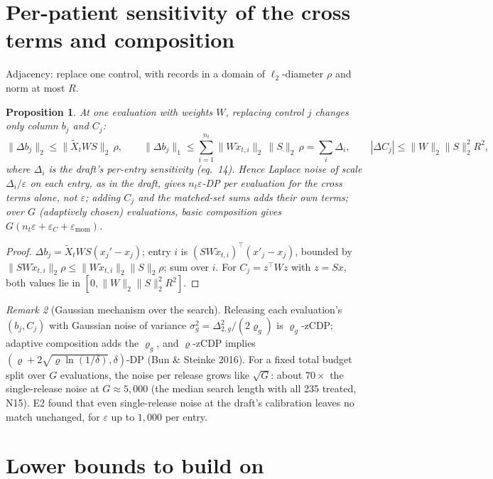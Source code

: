 \documentclass[11pt]{article}
\newtheorem{proposition}{Proposition}
\theoremstyle{remark}
\newtheorem{remark}[proposition]{Remark}
\begin{document}
\section{Per-patient sensitivity of the cross terms and composition}

Adjacency: replace one control, with records in a domain of $\ell_2$-diameter $\rho$ and norm at
most $R$.

\begin{proposition}\label{prop:sens}
At one evaluation with weights $W$, replacing control $j$ changes only column $b_j$ and $C_j$:
\[
\|\Delta b_j\|_2\le\|\tilde X_tWS\|_2\,\rho,\qquad
\|\Delta b_j\|_1\le\sum_{i=1}^{n_t}\|W\tilde x_{t,i}\|_2\,\|S\|_2\,\rho=\sum_i\Delta_i,\qquad
|\Delta C_j|\le\|W\|_2\|S\|_2^2R^2,
\]
where $\Delta_i$ is the draft's per-entry sensitivity (eq.~14). Hence Laplace noise of scale
$\Delta_i/\varepsilon$ on each entry, as in the draft, gives $n_t\varepsilon$-DP per evaluation
for the cross terms alone, not $\varepsilon$; adding $C_j$ and the matched-set sums adds
their own terms; over $G$ (adaptively chosen) evaluations, basic composition gives
$G(n_t\varepsilon+\varepsilon_C+\varepsilon_{\mathrm{mom}})$.
\end{proposition}
\begin{proof}
$\Delta b_j=\tilde X_tWS(x_j'-x_j)$; entry $i$ is $(SW\tilde x_{t,i})^\top(x'_j-x_j)$, bounded by
$\|SW\tilde x_{t,i}\|_2\rho\le\|W\tilde x_{t,i}\|_2\|S\|_2\rho$; sum over $i$. For $C_j=z^\top Wz$
with $z=Sx$, both values lie in $[0,\|W\|_2\|S\|_2^2R^2]$.
\end{proof}

\begin{remark}[Gaussian mechanism over the search]
Releasing each evaluation's $(b_j,C_j)$ with Gaussian noise of variance
$\sigma_g^2=\Delta_{2,g}^2/(2\varrho_g)$ is $\varrho_g$-zCDP; adaptive composition adds the
$\varrho_g$, and $\varrho$-zCDP implies $(\varrho+2\sqrt{\varrho\ln(1/\delta)},\delta)$-DP (Bun \&
Steinke 2016). For a fixed total budget split over $G$ evaluations, the noise per release grows
like $\sqrt G$: about $70\times$ the single-release noise at $G\approx5{,}000$ (the median search
length with all 235 treated, N15). E2 found that even single-release noise at the draft's calibration leaves no match
unchanged, for $\varepsilon$ up to $1{,}000$ per entry.
\end{remark}

\section{Lower bounds to build on}
\end{document}
